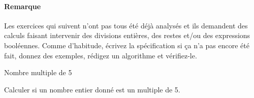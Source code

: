 \bigskip
\bigskip
\bigskip
\begin{Emphase}
	
	\paragraph{Remarque}
	Les exercices qui suivent n’ont pas tous été déjà analysés et ils demandent
	des calculs faisant intervenir des divisions entières, des restes et/ou des
	expressions booléennes.  Comme d’habitude, écrivez la spécification si ça
	n’a pas encore été fait, donnez des exemples, rédigez un algorithme et
	vérifiez-le.

\end{Emphase}

		\begin{Exercice}{Nombre multiple de 5}

			\label{algo:mult5}
			Calculer si un nombre entier donné est un multiple de 5.

			\clearpage

\end{Exercice}
